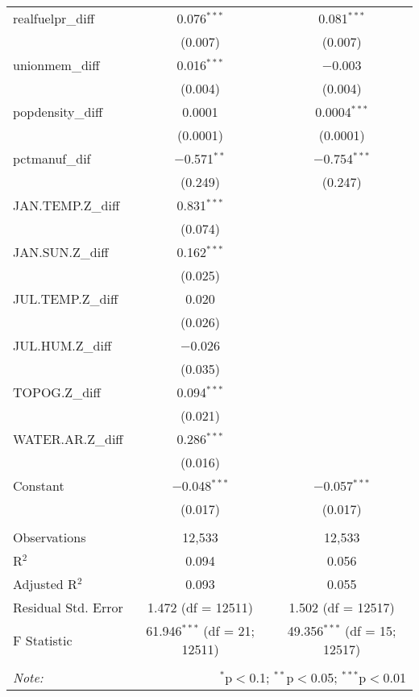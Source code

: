 \begin{table}[!htbp]
\begin{tabular}{@{\extracolsep{5pt}}lcc}
  realfuelpr\_diff & 0.076$^{***}$ & 0.081$^{***}$ \\ 
  & (0.007) & (0.007) \\ 
  unionmem\_diff & 0.016$^{***}$ & $-$0.003 \\ 
  & (0.004) & (0.004) \\ 
  popdensity\_diff & 0.0001 & 0.0004$^{***}$ \\ 
  & (0.0001) & (0.0001) \\ 
  pctmanuf\_dif & $-$0.571$^{**}$ & $-$0.754$^{***}$ \\ 
  & (0.249) & (0.247) \\ 
  JAN.TEMP.Z\_diff & 0.831$^{***}$ &  \\ 
  & (0.074) &  \\ 
  JAN.SUN.Z\_diff & 0.162$^{***}$ &  \\ 
  & (0.025) &  \\ 
  JUL.TEMP.Z\_diff & 0.020 &  \\ 
  & (0.026) &  \\ 
  JUL.HUM.Z\_diff & $-$0.026 &  \\ 
  & (0.035) &  \\ 
  TOPOG.Z\_diff & 0.094$^{***}$ &  \\ 
  & (0.021) &  \\ 
  WATER.AR.Z\_diff & 0.286$^{***}$ &  \\ 
  & (0.016) &  \\ 
  Constant & $-$0.048$^{***}$ & $-$0.057$^{***}$ \\ 
  & (0.017) & (0.017) \\ 
 \hline \\[-1.8ex] 
Observations & 12,533 & 12,533 \\ 
R$^{2}$ & 0.094 & 0.056 \\ 
Adjusted R$^{2}$ & 0.093 & 0.055 \\ 
Residual Std. Error & 1.472 (df = 12511) & 1.502 (df = 12517) \\ 
F Statistic & 61.946$^{***}$ (df = 21; 12511) & 49.356$^{***}$ (df = 15; 12517) \\ 
\hline 
\hline \\[-1.8ex] 
\textit{Note:}  & \multicolumn{2}{r}{$^{*}$p$<$0.1; $^{**}$p$<$0.05; $^{***}$p$<$0.01} \\ 
\end{tabular} 
\end{table} 
